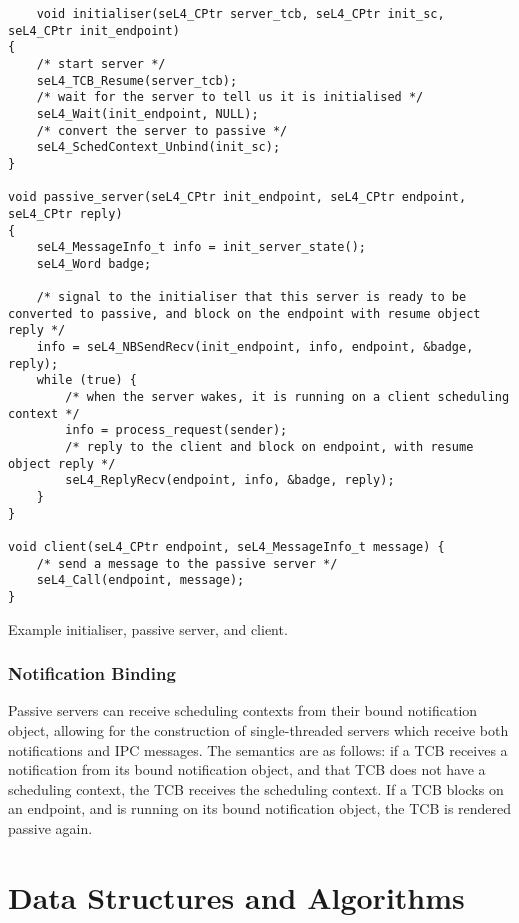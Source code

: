 \begin{listing}[t]
\begin{verbatim}
    void initialiser(seL4_CPtr server_tcb, seL4_CPtr init_sc, seL4_CPtr init_endpoint) 
{
    /* start server */
    seL4_TCB_Resume(server_tcb);
    /* wait for the server to tell us it is initialised */
    seL4_Wait(init_endpoint, NULL);
    /* convert the server to passive */
    seL4_SchedContext_Unbind(init_sc);
}

void passive_server(seL4_CPtr init_endpoint, seL4_CPtr endpoint, seL4_CPtr reply) 
{    
    seL4_MessageInfo_t info = init_server_state();
    seL4_Word badge;

    /* signal to the initialiser that this server is ready to be converted to passive, and block on the endpoint with resume object reply */
    info = seL4_NBSendRecv(init_endpoint, info, endpoint, &badge, reply);
    while (true) {
        /* when the server wakes, it is running on a client scheduling context */
        info = process_request(sender);
        /* reply to the client and block on endpoint, with resume object reply */
        seL4_ReplyRecv(endpoint, info, &badge, reply);
    }
}

void client(seL4_CPtr endpoint, seL4_MessageInfo_t message) {
    /* send a message to the passive server */
    seL4_Call(endpoint, message);
}
\end{verbatim}
\caption{Example initialiser, passive server, and client.}
\label{list:passive-server}
\end{listing}

\subsubsection{Notification Binding}

Passive servers can receive scheduling contexts from their bound notification object, allowing for
the construction of single-threaded servers which receive both notifications and IPC messages. 
The semantics are as follows: if a TCB receives a notification from its bound notification
object, and that TCB does not have a scheduling context, the TCB receives the scheduling context.
If a TCB blocks on an endpoint, and is running on its bound notification object, the TCB is
rendered passive again. 

\section{Data Structures and Algorithms}

